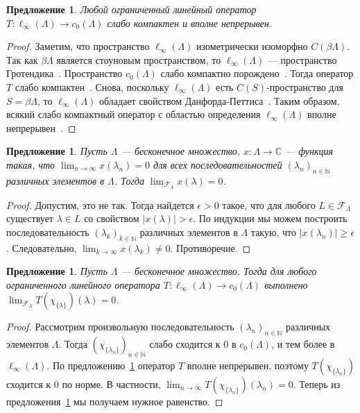 \documentclass[12pt]{article}
\newtheorem{proposition}[theorem]{Предложение}
\begin{document}
\begin{proposition}\label{OpLInfc0CompContWeakComp} Любой ограниченный линейный
    оператор $T:\ell_\infty(\Lambda)\to c_0(\Lambda)$ слабо компактен и вполне
    непрерывен.
\end{proposition}
\begin{proof} Заметим, что пространство $\ell_\infty(\Lambda)$ изометрически
    изоморфно $C(\beta\Lambda)$. Так как $\beta\Lambda$ является стоуновым
    пространством, то $\ell_\infty(\Lambda)$ --- пространство
    Гротендика~\cite[теорема 9, стр. 168]{GrothApplFabilCompCK}. Пространство
    $c_0(\Lambda)$ слабо компактно порождено~\cite[параграф 13.1 пример
        (iii)]{FabHabBanSpTh}. Тогда оператор $T$ слабо компактен~\cite[пример
        13.33]{FabHabBanSpTh}. Снова, поскольку $\ell_\infty(\Lambda)$ есть
    $C(S)$-пространство для $S=\beta\Lambda$, то $\ell_\infty(\Lambda)$ обладает
    свойством Данфорда-Петтиса~\cite[теорема 13.43]{FabHabBanSpTh}. Таким
    образом, всякий слабо компактный оператор с областью определения
    $\ell_\infty(\Lambda)$ вполне непрерывен~\cite[предложение
        13.42]{FabHabBanSpTh}.
\end{proof}

\begin{proposition}\label{FrechFiltConvCharac} Пусть $\Lambda$ --- бесконечное
    множество, $x:\Lambda\to\mathbb{C}$ --- функция такая, что
    $\lim_{n\to\infty} x(\lambda_n)=0$ для всех последовательностей
    ${(\lambda_n)}_{n\in\mathbb{N}}$ различных элементов в $\Lambda$. Тогда
    $\lim_{\mathcal{F}_{\Lambda}}x(\lambda)=0$.
\end{proposition}
\begin{proof} Допустим, это не так. Тогда найдется $\epsilon > 0$ такое, что для
    любого $L\in\mathcal{F}_{\Lambda}$ существует $\lambda\in L$ со свойством
    $|x(\lambda)|>\epsilon$. По индукции мы можем построить последовательность
    ${(\lambda_k)}_{k\in\mathbb{N}}$ различных элементов в $\Lambda$ такую, что
    $|x(\lambda_n)|\geq \epsilon$. Следовательно, $\lim_{k\to\infty}
        x(\lambda_k)\neq 0$. Противоречие.
\end{proof}

\begin{proposition}\label{OpLInfc0DiagConv0} Пусть $\Lambda$ --- бесконечное
    множество. Тогда для любого ограниченного линейного оператора
    $T:\ell_\infty(\Lambda)\to c_0(\Lambda)$ выполнено
    $\lim_{\mathcal{F}_{\Lambda}}T(\chi_{ \{\lambda \}})(\lambda)=0$.
\end{proposition}
\begin{proof} Рассмотрим произвольную последовательность
    ${(\lambda_n)}_{n\in\mathbb{N}}$ различных элементов $\Lambda$. Тогда
    ${(\chi_{\{\lambda_n\}})}_{n\in\mathbb{N}}$ слабо сходится к 0 в
    $c_0(\Lambda)$, и тем более в $\ell_\infty(\Lambda)$. По
    предложению~\ref{OpLInfc0CompContWeakComp} оператор $T$ вполне непрерывен,
    поэтому $T(\chi_{\{\lambda_n\}})$ сходится к 0 по норме. В частности,
    $\lim_{n\to\infty} T(\chi_{\{\lambda_n\}})(\lambda_n)=0$. Теперь из
    предложения~\ref{FrechFiltConvCharac} мы получаем нужное равенство.
\end{proof}
\end{document}
